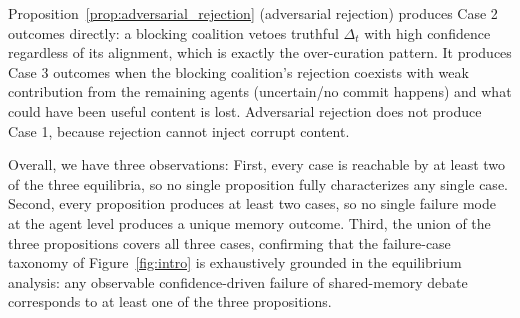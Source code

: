 Proposition~\ref{prop:adversarial_rejection} (adversarial rejection) produces Case 2 outcomes directly: a blocking coalition vetoes truthful $\Delta_t$ with high confidence regardless of its alignment, which is exactly the over-curation pattern. It produces Case 3 outcomes when the blocking coalition's rejection coexists with weak contribution from the remaining agents (uncertain/no commit happens) and what could have been useful content is lost. Adversarial rejection does not produce Case 1, because rejection cannot inject corrupt content.


Overall, we have three observations: First, every case is reachable by at least two of the three equilibria, so no single proposition fully characterizes any single case. Second, every proposition produces at least two cases, so no single failure mode at the agent level produces a unique memory outcome. Third, the union of the three propositions covers all three cases, confirming that the failure-case taxonomy of Figure~\ref{fig:intro} is exhaustively grounded in the equilibrium analysis: any observable confidence-driven failure of shared-memory debate corresponds to at least one of the three propositions.

